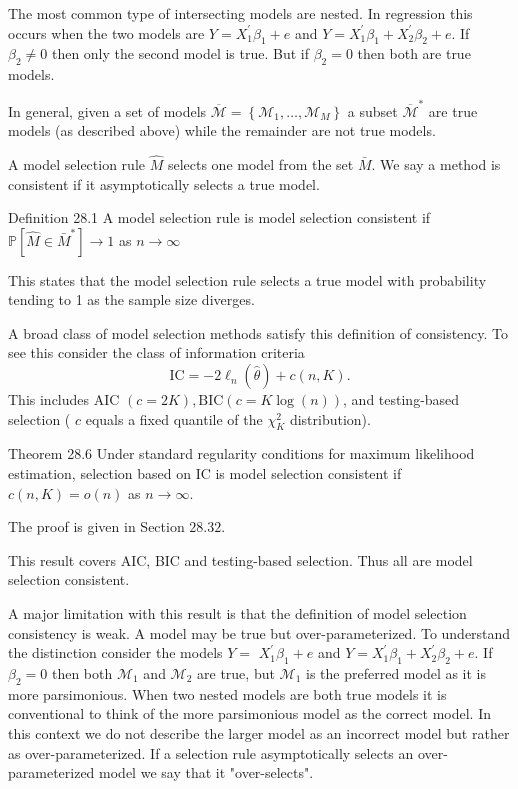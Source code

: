 \documentclass[10pt]{article}
\begin{document}
The most common type of intersecting models are nested. In regression this occurs when the two models are $Y=X_{1}^{\prime} \beta_{1}+e$ and $Y=X_{1}^{\prime} \beta_{1}+X_{2}^{\prime} \beta_{2}+e$. If $\beta_{2} \neq 0$ then only the second model is true. But if $\beta_{2}=0$ then both are true models.

In general, given a set of models $\overline{\mathscr{M}}=\left\{\mathscr{M}_{1}, \ldots, \mathscr{M}_{M}\right\}$ a subset $\overline{\mathscr{M}}^{*}$ are true models (as described above) while the remainder are not true models.

A model selection rule $\widehat{M}$ selects one model from the set $\bar{M}$. We say a method is consistent if it asymptotically selects a true model.

Definition 28.1 A model selection rule is model selection consistent if $\mathbb{P}\left[\widehat{M} \in \bar{M}^{*}\right] \rightarrow 1$ as $n \rightarrow \infty$

This states that the model selection rule selects a true model with probability tending to 1 as the sample size diverges.

A broad class of model selection methods satisfy this definition of consistency. To see this consider the class of information criteria
$$
\mathrm{IC}=-2 \ell_{n}(\widehat{\theta})+c(n, K) .
$$
This includes AIC $(c=2 K), \mathrm{BIC}(c=K \log (n))$, and testing-based selection ( $c$ equals a fixed quantile of the $\chi_{K}^{2}$ distribution).

Theorem 28.6 Under standard regularity conditions for maximum likelihood estimation, selection based on IC is model selection consistent if $c(n, K)=o(n)$ as $n \rightarrow \infty$.

The proof is given in Section $28.32$.

This result covers AIC, BIC and testing-based selection. Thus all are model selection consistent.

A major limitation with this result is that the definition of model selection consistency is weak. A model may be true but over-parameterized. To understand the distinction consider the models $Y=$ $X_{1}^{\prime} \beta_{1}+e$ and $Y=X_{1}^{\prime} \beta_{1}+X_{2}^{\prime} \beta_{2}+e$. If $\beta_{2}=0$ then both $\mathscr{M}_{1}$ and $\mathscr{M}_{2}$ are true, but $\mathscr{M}_{1}$ is the preferred model as it is more parsimonious. When two nested models are both true models it is conventional to think of the more parsimonious model as the correct model. In this context we do not describe the larger model as an incorrect model but rather as over-parameterized. If a selection rule asymptotically selects an over-parameterized model we say that it "over-selects".
\end{document}
